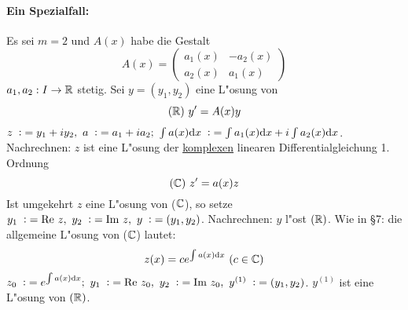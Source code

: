 \documentclass{article}
\begin{document}
\paragraph{Ein Spezialfall:}Es sei $m=2$ und $A(x)$ habe die Gestalt 
\[
	A(x)=\begin{pmatrix}
		a_1(x) & -a_2(x) \\
		a_2(x) & a_1(x)
	\end{pmatrix}
\]
$a_1, a_2:I\to\mathbb{R}$ stetig. Sei $y=(y_1, y_2)$ eine L"osung von
\[
	(\mathbb{R})\ y'=A(x)y
\]
$z\da y_1+iy_2,\ a\da a_1+ia_2;\ \int a(x)\text{d}x\da \int a_1(x)\text{d}x + i\int a_2(x)\text{d}x$.
Nachrechnen: $z$ ist eine L"osung der \underline{komplexen} linearen Differentialgleichung 1. Ordnung
\[
	(\mathbb{C})\ z'=a(x)z
\]
Ist umgekehrt $z$ eine L"osung von ($\mathbb{C}$), so setze $y_1\da \text{Re }z,\ y_2\da \text{Im }z,\ y\da (y_1, y_2)$. Nachrechnen: $y$ l"ost $(\mathbb{R})$.
Wie in §7: die allgemeine L"osung von ($\mathbb{C}$) lautet:
\[
	z(x)=ce^{\int a(x)\text{d}x}\ (c\in\MdC)
\]
$z_0\da e^{\int a(x)\text{d}x};\ y_1\da \text{Re }z_0,\ y_2\da \text{Im }z_0,\ y^{(1)}\da (y_1, y_2)$. $y^{(1)}$ ist eine L"osung von $(\mathbb{R})$.
\end{document}
